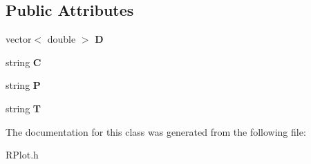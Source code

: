 \subsection*{Public Attributes}
\begin{DoxyCompactItemize}
\item 
\hypertarget{classYseries_aeb321ec45633adf99bb54b70ff77ffef}{}vector$<$ double $>$ {\bfseries D}\label{classYseries_aeb321ec45633adf99bb54b70ff77ffef}

\item 
\hypertarget{classYseries_a4b1beb6b072129a31a13cd59cd1d8359}{}string {\bfseries C}\label{classYseries_a4b1beb6b072129a31a13cd59cd1d8359}

\item 
\hypertarget{classYseries_a9a6fb62d1d73bbaf9f5bc5e0797389f9}{}string {\bfseries P}\label{classYseries_a9a6fb62d1d73bbaf9f5bc5e0797389f9}

\item 
\hypertarget{classYseries_acfa4f5a5f1259fb07c0265e8983df5bd}{}string {\bfseries T}\label{classYseries_acfa4f5a5f1259fb07c0265e8983df5bd}

\end{DoxyCompactItemize}


The documentation for this class was generated from the following file\+:\begin{DoxyCompactItemize}
\item 
R\+Plot.\+h\end{DoxyCompactItemize}
